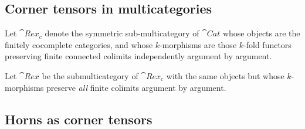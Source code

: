 \subsection{Corner tensors in multicategories}
\begin{defn} Let \(\cat{Rex_c}\) denote the symmetric sub-multicategory of \(\cat{Cat}\) whose objects are the finitely cocomplete categories, and whose \(k\)-morphisms are those \(k\)-fold functors preserving finite connected colimits independently argument by argument.  

Let \(\cat{Rex}\) be the submulticategory of \(\cat{Rex_c}\) with the same objects but whose \(k\)-morphisms preserve \emph{all} finite colimits argument by argument. 
\end{defn}

\subsection{Horns as corner tensors}